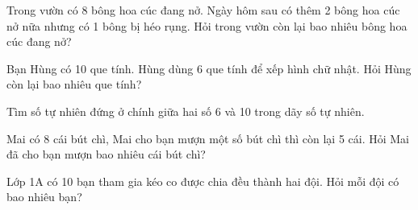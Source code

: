 \begin{ex} %
Trong vườn có 8 bông hoa cúc đang nở. Ngày hôm sau có thêm 2 bông hoa cúc nở nữa nhưng có 1 bông bị héo rụng. Hỏi trong vườn còn lại bao nhiêu bông hoa cúc đang nở?
\end{ex}

\begin{ex} %
Bạn Hùng có 10 que tính. Hùng dùng 6 que tính để xếp hình chữ nhật. Hỏi Hùng còn lại bao nhiêu que tính?
\end{ex}

\begin{ex} %
Tìm số tự nhiên đứng ở chính giữa hai số 6 và 10 trong dãy số tự nhiên.
\end{ex}

\begin{ex} %
Mai có 8 cái bút chì, Mai cho bạn mượn một số bút chì thì còn lại 5 cái. Hỏi Mai đã cho bạn mượn bao nhiêu cái bút chì?
\end{ex}

\begin{ex} %
Lớp 1A có 10 bạn tham gia kéo co được chia đều thành hai đội. Hỏi mỗi đội có bao nhiêu bạn?
\end{ex}

